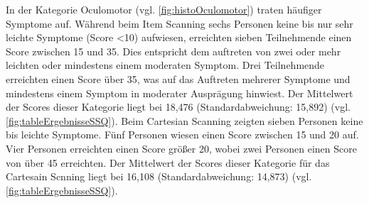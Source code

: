 In der Kategorie Oculomotor (vgl. \autoref{fig:histoOculomotor}) traten häufiger Symptome auf. Während beim Item Scanning sechs Personen keine bis nur sehr leichte Symptome (Score <10) aufwiesen, erreichten sieben Teilnehmende einen Score zwischen 15 und 35. Dies entspricht dem auftreten von zwei oder mehr leichten oder mindestens einem moderaten Symptom. Drei Teilnehmende erreichten einen Score über 35, was auf das Auftreten mehrerer Symptome und mindestens einem Symptom in moderater Ausprägung hinwiest. Der Mittelwert der Scores dieser Kategorie liegt bei 18,476 (Standardabweichung: 15,892) (vgl. \autoref{fig:tableErgebnisseSSQ}). Beim Cartesian Scanning zeigten sieben Personen keine bis leichte Symptome. Fünf Personen wiesen einen Score zwischen 15 und 20 auf. Vier Personen erreichten einen Score größer 20, wobei zwei Personen einen Score von über 45 erreichten. Der Mittelwert der Scores dieser Kategorie für das Cartesain Scnning liegt bei 16,108 (Standardabweichung: 14,873) (vgl. \autoref{fig:tableErgebnisseSSQ}).

